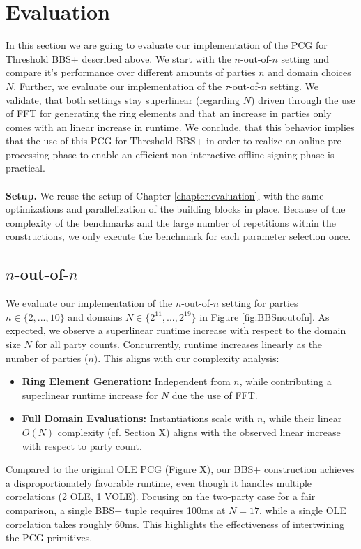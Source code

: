 \section{Evaluation}
In this section we are going to evaluate our implementation of the PCG for Threshold BBS+ described above. We start with the $n$-out-of-$n$ setting and compare it's performance over different amounts of parties $n$ and domain choices $N$. Further, we evaluate our implementation of the $\tau$-out-of-$n$ setting. We validate, that both settings stay superlinear (regarding $N$) driven through the use of FFT for generating the ring elements and that an increase in parties only comes with an linear increase in runtime. We conclude, that this behavior implies that the use of this PCG for Threshold BBS+ in order to realize an online pre-processing phase to enable an efficient non-interactive offline signing phase is practical. 
\\\\
\textbf{Setup.} We reuse the setup of Chapter \ref{chapter:evaluation}, with the same optimizations and parallelization of the building blocks in place. Because of the complexity of the benchmarks and the large number of repetitions within the constructions, we only execute the benchmark for each parameter selection once.

\subsection{$n$-out-of-$n$}
We evaluate our implementation of the $n$-out-of-$n$ setting for parties $n\in \{2, ..., 10\}$ and domains $N\in \{2^{11}, ...,2^{19}\}$ in Figure \ref{fig:BBSnoutofn}. As expected, we observe a superlinear runtime increase with respect to the domain size $N$ for all party counts. Concurrently, runtime increases linearly as the number of parties ($n$). This aligns with our complexity analysis:

\begin{itemize}
    \item \textbf{Ring Element Generation:} Independent from $n$, while contributing a superlinear runtime increase for $N$ due the use of FFT.
    \item \textbf{Full Domain Evaluations:} Instantiations scale with $n$, while their linear $O(N)$ complexity (cf. Section X) aligns with the observed linear increase with respect to party count.
\end{itemize}

Compared to the original OLE PCG (Figure X), our BBS+ construction achieves a disproportionately favorable runtime, even though it handles multiple correlations (2 OLE, 1 VOLE). Focusing on the two-party case for a fair comparison, a single BBS+ tuple requires 100ms at $N=17$, while a single OLE correlation takes roughly 60ms. This highlights the effectiveness of intertwining the PCG primitives.

